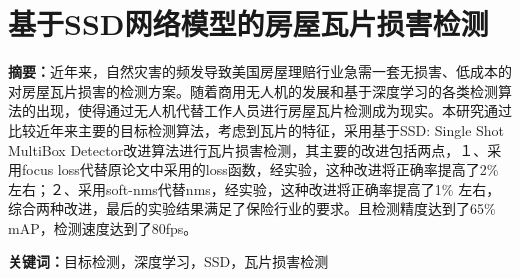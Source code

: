 \section*{基于SSD网络模型的房屋瓦片损害检测}
\par \noindent
\textbf{\songti {}摘要：}近年来，自然灾害的频发导致美国房屋理赔行业急需一套无损害、低成本的对房屋瓦片损害的检测方案。随着商用无人机的发展和基于深度学习的各类检测算法的出现，使得通过无人机代替工作人员进行房屋瓦片检测成为现实。本研究通过比较近年来主要的目标检测算法，考虑到瓦片的特征，采用基于SSD: Single Shot MultiBox Detector\cite{ssd}改进算法进行瓦片损害检测，其主要的改进包括两点，１、采用focus loss代替原论文中采用的loss函数，经实验，这种改进将正确率提高了2\% 左右；２、采用soft-nms代替nms，经实验，这种改进将正确率提高了1\% 左右，综合两种改进，最后的实验结果满足了保险行业的要求。且检测精度达到了65\%　mAP，检测速度达到了80fps。

\par \noindent
\textbf{\songti {}关键词：}{\kaishu {}目标检测，深度学习，SSD，瓦片损害检测}

